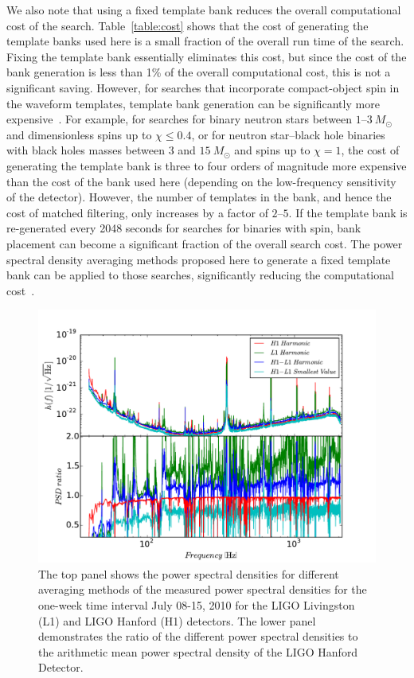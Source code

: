 \documentclass[12pt]{iopart} \usepackage{graphicx,amssymb}
\begin{document}
We also note that using a fixed template bank reduces the overall
computational cost of the search. Table~\ref{table:cost} shows that the cost
of generating the template banks used here is a small fraction of the overall
run time of the search. Fixing the template bank essentially eliminates this
cost, but since the cost of the bank generation is less than 1\% of the
overall computational cost, this is not a significant saving.  However, for
searches that incorporate compact-object spin in the waveform templates,
template bank generation can be significantly more
expensive~\cite{Harry:2009ea,Brown:2012qf,Canton:2014ena}. For example, for
searches for binary neutron stars between $1$--$3\ M_\odot$  and dimensionless
spins up to $\chi \le 0.4$, or for neutron star--black hole binaries with black
holes masses between $3$ and $15\ M_\odot$ and spins up to $\chi = 1$, the
cost of generating the template bank is three to four orders of magnitude more
expensive than the cost of the bank used here (depending on the low-frequency
sensitivity of the detector). However, the number of templates in the bank, and
hence the cost of matched filtering, only increases by a factor of $2$--$5$.
If the template bank is re-generated every 2048 seconds for 
searches for binaries with spin, bank placement can become a significant fraction of the
overall search cost. The power spectral density averaging methods proposed
here to generate a fixed template bank can be applied to those searches,
significantly reducing the computational cost~\cite{Canton:2014ena}.

\begin{figure}[t!bp]	
\begin{center}
\includegraphics[width=0.65\linewidth]{figures/psd_comparison.pdf}
\caption{The top panel shows the power spectral densities for different
averaging methods of the measured power spectral densities for the one-week
time interval July 08-15, 2010 for the LIGO Livingston (L1) and LIGO Hanford
(H1) detectors.  The lower panel demonstrates the ratio of the
different power spectral densities to the arithmetic mean power spectral
density of the LIGO Hanford Detector.}
\label{different-psds}
\end{center}
\end{figure}
\end{document}
